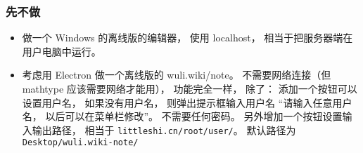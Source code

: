 \subsubsection{先不做}
\begin{itemize}
\item 做一个 Windows 的离线版的编辑器， 使用 localhost， 相当于把服务器端在用户电脑中运行。

\item 考虑用 Electron 做一个离线版的 wuli.wiki/note。 不需要网络连接（但 mathtype 应该需要网络才能用）， 功能完全一样， 除了： 添加一个按钮可以设置用户名， 如果没有用户名， 则弹出提示框输入用户名 “请输入任意用户名， 以后可以在菜单栏修改”。 不需要任何密码。 另外增加一个按钮设置输入输出路径， 相当于 \verb|littleshi.cn/root/user/|。 默认路径为 \verb|Desktop/wuli.wiki-note/|
\end{itemize}

